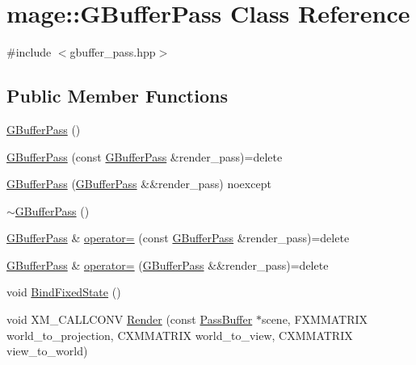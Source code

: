 \hypertarget{classmage_1_1_g_buffer_pass}{}\section{mage\+:\+:G\+Buffer\+Pass Class Reference}
\label{classmage_1_1_g_buffer_pass}


{\ttfamily \#include $<$gbuffer\+\_\+pass.\+hpp$>$}

\subsection*{Public Member Functions}
\begin{DoxyCompactItemize}
\item 
\hyperlink{classmage_1_1_g_buffer_pass_afe455d4051cddf84b7752b4bf4aa282f}{G\+Buffer\+Pass} ()
\item 
\hyperlink{classmage_1_1_g_buffer_pass_a3b9f59097aef9175f942c9c9424d0dab}{G\+Buffer\+Pass} (const \hyperlink{classmage_1_1_g_buffer_pass}{G\+Buffer\+Pass} \&render\+\_\+pass)=delete
\item 
\hyperlink{classmage_1_1_g_buffer_pass_a86b04cb5e55d63a2fabc041ef0c7dcf9}{G\+Buffer\+Pass} (\hyperlink{classmage_1_1_g_buffer_pass}{G\+Buffer\+Pass} \&\&render\+\_\+pass) noexcept
\item 
\hyperlink{classmage_1_1_g_buffer_pass_a34b2735cfb9b3546c903760f42ff770c}{$\sim$\+G\+Buffer\+Pass} ()
\item 
\hyperlink{classmage_1_1_g_buffer_pass}{G\+Buffer\+Pass} \& \hyperlink{classmage_1_1_g_buffer_pass_a79468fb8b4547197315c0aabbabffa71}{operator=} (const \hyperlink{classmage_1_1_g_buffer_pass}{G\+Buffer\+Pass} \&render\+\_\+pass)=delete
\item 
\hyperlink{classmage_1_1_g_buffer_pass}{G\+Buffer\+Pass} \& \hyperlink{classmage_1_1_g_buffer_pass_ace14aafdd028f12296b3fabf1e36ca02}{operator=} (\hyperlink{classmage_1_1_g_buffer_pass}{G\+Buffer\+Pass} \&\&render\+\_\+pass)=delete
\item 
void \hyperlink{classmage_1_1_g_buffer_pass_a4a13364cc0318417f31df50d7081b0b0}{Bind\+Fixed\+State} ()
\item 
void X\+M\+\_\+\+C\+A\+L\+L\+C\+O\+NV \hyperlink{classmage_1_1_g_buffer_pass_a67b030c2efe8daa5aad105307fa09887}{Render} (const \hyperlink{structmage_1_1_pass_buffer}{Pass\+Buffer} $\ast$scene, F\+X\+M\+M\+A\+T\+R\+IX world\+\_\+to\+\_\+projection, C\+X\+M\+M\+A\+T\+R\+IX world\+\_\+to\+\_\+view, C\+X\+M\+M\+A\+T\+R\+IX view\+\_\+to\+\_\+world)
\end{DoxyCompactItemize}
